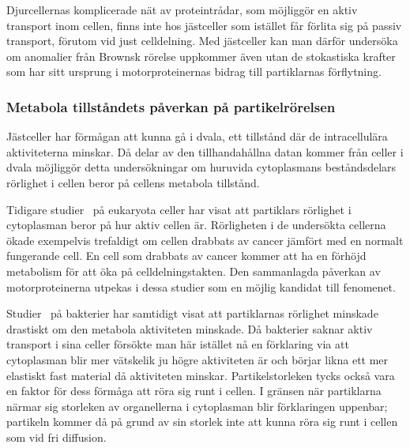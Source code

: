 Djurcellernas komplicerade nät av proteintrådar, som möjliggör en aktiv
transport inom cellen, finns inte hos jästceller som istället får
förlita sig på passiv transport, förutom vid just
celldelning.  
Med jästceller kan man därför undersöka om anomalier från Brownsk
rörelse uppkommer även utan de 
stokastiska krafter som har sitt ursprung i motorproteinernas bidrag
till partiklarnas förflytning.


\subsubsection{Metabola tillståndets påverkan på partikelrörelsen}
Jästceller har förmågan att kunna gå i dvala, ett tillstånd där de
intracellulära aktiviteterna minskar. Då delar av den tillhandahållna
datan kommer från celler i dvala möjliggör detta undersökningar om
huruvida cytoplasmans beståndsdelars rörlighet i cellen beror på
cellens metabola tillstånd. 

Tidigare studier~\cite{Gou_etal2014} på eukaryota celler har visat att
partiklars rörlighet i cytoplasman beror på hur aktiv cellen
är. Rörligheten i de undersökta cellerna ökade exempelvis
trefaldigt om cellen drabbats av cancer jämfört med en normalt
fungerande cell. En cell som drabbats av cancer kommer att ha en
förhöjd metabolism för att öka på celldelningstakten. Den sammanlagda
påverkan av motorproteinerna utpekas i dessa studier
som en möjlig kandidat till fenomenet. 

Studier~\cite{Parry_etal2014} på bakterier har samtidigt visat att
partiklarnas rörlighet minskade drastiskt om den metabola aktiviteten
minskade. Då bakterier saknar aktiv transport i sina celler försökte
man här istället nå en förklaring via att
cytoplasman blir mer vätskelik ju högre aktiviteten är och börjar
likna ett mer elastiskt fast material då aktiviteten
minskar. Partikelstorleken tycks också vara en faktor för dess förmåga
att röra sig runt i cellen. I gränsen när partiklarna närmar sig
storleken av organellerna i cytoplasman blir förklaringen uppenbar;
partikeln kommer då på grund av sin storlek inte att kunna röra sig
runt i cellen som vid fri diffusion. 


